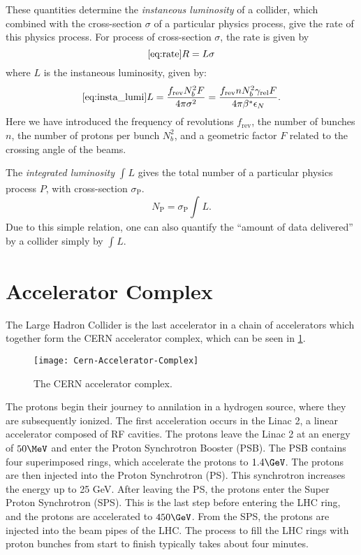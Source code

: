 These quantities determine the \textit{instaneous luminosity} of a collider, which combined with the cross-section $\sigma$ of a particular physics process, give the rate of this physics process.
For process of cross-section $\sigma$, the rate is given by
\begin{equation} \ref{eq:rate}
R = L \sigma
\end{equation}
where $L$ is the instaneous luminosity, given by:
\begin{equation}\ref{eq:insta_lumi}
L = \frac{f_{\text{rev}} N_b^2 F}{4 \pi \sigma^2}= \frac{f_{\text{rev}} n N_b^2 \gamma_{\text{rel}} F }{ 4\pi \beta^* \epsilon_N}.
\end{equation}
Here we have introduced the frequency of revolutions $f_{\text{rev}}$, the number of bunches $n$, the number of protons per bunch $N_b^2$, and a geometric factor $F$ related to the crossing angle of the beams.

The \textit{integrated luminosity} $\int_{}^{} L$ gives the total number of a particular physics process $P$, with cross-section $\sigma_{\text{P}}$.
\begin{equation}
N_{\text{P}} = \sigma_{\text{P}} \int_{}^{} L.
\end{equation}
Due to this simple relation, one can also quantify the ``amount of data delivered'' by a collider simply by $\int_{}^{} L$.

\section{Accelerator Complex}

The Large Hadron Collider is the last accelerator in a chain of accelerators which together form the CERN accelerator complex, which can be seen in \ref{fig:accelerator_complex}.
\begin{figure}
\caption{The CERN accelerator complex.}\label{fig:accelerator_complex}
\texttt{[image: Cern-Accelerator-Complex]}
\end{figure}
The protons begin their journey to annilation in a hydrogen source, where they are subsequently ionized.
The first acceleration occurs in the Linac 2, a linear accelerator composed of RF cavities.
The protons leave the Linac 2 at an energy of $50 \MeV$ and enter the Proton Synchrotron Booster (PSB).
The PSB contains four superimposed rings, which accelerate the protons to $1.4 \GeV$.
The protons are then injected into the Proton Synchrotron (PS).
This synchrotron increases the energy up to 25 GeV.
After leaving the PS, the protons enter the Super Proton Synchrotron (SPS).
This is the last step before entering the LHC ring, and the protons are accelerated to $450 \GeV$.
From the SPS, the protons are injected into the beam pipes of the LHC.
The process to fill the LHC rings with proton bunches from start to finish typically takes about four minutes.

